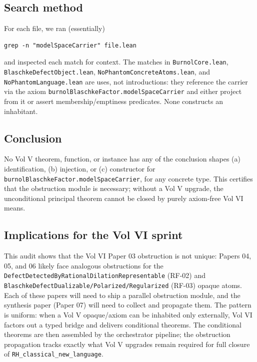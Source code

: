 \documentclass[12pt]{article}
\theoremstyle{definition}
\theoremstyle{remark}
\begin{document}
\subsection{Search method}

For each file, we ran (essentially)
\begin{verbatim}
grep -n "modelSpaceCarrier" file.lean
\end{verbatim}
and inspected each match for context. The matches in
\texttt{BurnolCore.lean}, \texttt{BlaschkeDefectObject.lean},
\texttt{NoPhantomConcreteAtoms.lean}, and \texttt{NoPhantomLanguage.lean}
are uses, not introductions: they reference the carrier via the axiom
\texttt{burnolBlaschkeFactor.modelSpaceCarrier} and either project from
it or assert membership/emptiness predicates. None constructs an
inhabitant.

\subsection{Conclusion}

No Vol V theorem, function, or instance has any of the conclusion
shapes (a) identification, (b) injection, or (c) constructor for
\texttt{burnolBlaschkeFactor.modelSpaceCarrier}, for any concrete type.
This certifies that the obstruction module is necessary; without a Vol V
upgrade, the unconditional principal theorem cannot be closed by purely
axiom-free Vol VI means.

\subsection{Implications for the Vol VI sprint}

This audit shows that the Vol VI Paper 03 obstruction is not unique:
Papers 04, 05, and 06 likely face analogous obstructions for the
\texttt{DefectDetectedByRationalDilationRepresentable} (RF-02) and
\texttt{BlaschkeDefectDualizable/Polarized/Regularized} (RF-03)
opaque atoms. Each of these papers will need to ship a parallel
obstruction module, and the synthesis paper (Paper 07) will need to
collect and propagate them. The pattern is uniform: when a Vol V
opaque/axiom can be inhabited only externally, Vol VI factors out a
typed bridge and delivers conditional theorems. The conditional
theorems are then assembled by the orchestrator pipeline; the
obstruction propagation tracks exactly what Vol V upgrades remain
required for full closure of \texttt{RH\_classical\_new\_language}.

\end{document}
